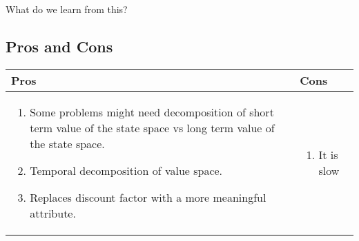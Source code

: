 What do we learn from this?

\subsection{Pros and Cons}
\begin{tabular}{p{}p{}}
  \toprule
  Pros & Cons \\
  \midrule
\begin{enumerate}
  \item Some problems might need decomposition of short term value of the state space vs long term value of the state space.
  \item Temporal decomposition of value space.
  \item Replaces discount factor with a more meaningful attribute.
\end{enumerate}
 & 
\begin{enumerate}
  \item It is slow
\end{enumerate}

\\ \bottomrule
\end{tabular}
